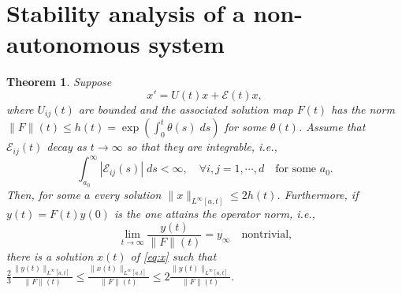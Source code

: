 \documentclass[a4paper,11pt]{article}
\newtheorem{theorem}{Theorem}
\theoremstyle{remark}
\begin{document}
\section{Stability analysis of a non-autonomous system}
\begin{theorem} \label{prop:stab}
 Suppose
 \begin{equation}
x' = U(t)x + \mathcal{E}(t)x, \label{eq:x}
 \end{equation}
where $U_{ij}(t)$ are bounded and the associated solution map $F(t)$ has the norm $\|F\|(t) \le h(t)=\exp\left(\int_0^t \theta(s)\; ds\right)$ for some $\theta(t)$. Assume that $\mathcal{E}_{ij}(t)$ decay as $t \rightarrow \infty$ so that they are integrable, i.e.,
 $$ \int_{a_0}^\infty |\mathcal{E}_{ij}(s)| \; ds < \infty, \quad \forall i,j=1,\cdots,d \quad \text{for some $a_0$.}$$
 Then, for some $a$ every solution $\|x\|_{L^\infty[a,t]} \le 2h(t)$. Furthermore, if $y(t)=F(t)y(0)$ is the one attains the operator norm, i.e.,
 $$ \lim_{t \rightarrow \infty}\frac{y(t)}{\|F\|(t)} = y_\infty \quad \text{nontrivial,}$$
 there is a solution $x(t)$ of \eqref{eq:x} such that $\displaystyle \frac{2}{3}\frac{\|y(t)\|_{L^\infty[a,t]}}{\|F\|(t)}\le\frac{\|x(t)\|_{L^\infty[a,t]}}{\|F\|(t)} \le 2\frac{\|y(t)\|_{L^\infty[a,t]}}{\|F\|(t)}.$
\end{theorem}
\end{document}

